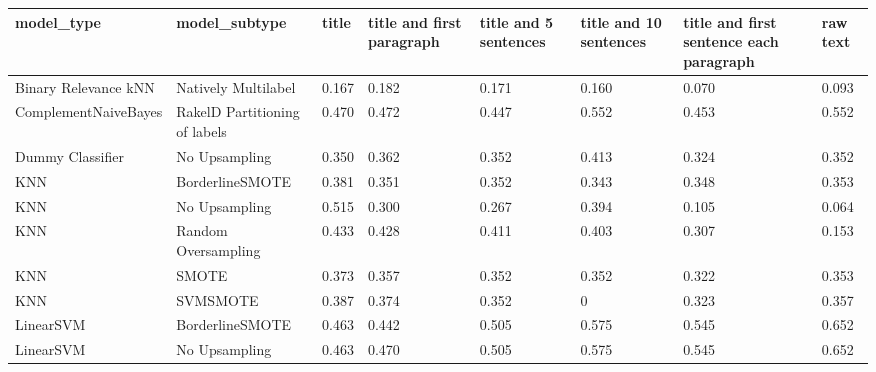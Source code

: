 \begin{tabular}{llllllll}
\toprule
                     model\_type &                 model\_subtype & title & title and first paragraph & title and 5 sentences & title and 10 sentences & title and first sentence each paragraph &  raw text \\
\midrule
           Binary Relevance kNN &           Natively Multilabel & 0.167 &                     0.182 &                 0.171 &                  0.160 &                                   0.070 &     0.093 \\
           ComplementNaiveBayes & RakelD Partitioning of labels & 0.470 &                     0.472 &                 0.447 &                  0.552 &                                   0.453 &     0.552 \\
               Dummy Classifier &                 No Upsampling & 0.350 &                     0.362 &                 0.352 &                  0.413 &                                   0.324 &     0.352 \\
                            KNN &               BorderlineSMOTE & 0.381 &                     0.351 &                 0.352 &                  0.343 &                                   0.348 &     0.353 \\
                            KNN &                 No Upsampling & 0.515 &                     0.300 &                 0.267 &                  0.394 &                                   0.105 &     0.064 \\
                            KNN &           Random Oversampling & 0.433 &                     0.428 &                 0.411 &                  0.403 &                                   0.307 &     0.153 \\
                            KNN &                         SMOTE & 0.373 &                     0.357 &                 0.352 &                  0.352 &                                   0.322 &     0.353 \\
                            KNN &                      SVMSMOTE & 0.387 &                     0.374 &                 0.352 &                      0 &                                   0.323 &     0.357 \\
                      LinearSVM &               BorderlineSMOTE & 0.463 &                     0.442 &                 0.505 &                  0.575 &                                   0.545 &     0.652 \\
                      LinearSVM &                 No Upsampling & 0.463 &                     0.470 &                 0.505 &                  0.575 &                                   0.545 &     0.652 \\

\end{tabular}
